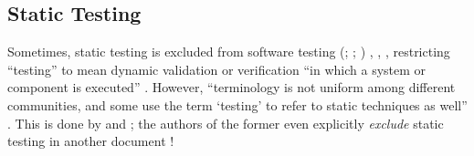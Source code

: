 \subsection{Static Testing}
\label{static-test}
Sometimes, static testing is excluded from software testing
\ifnotpaper
    (\citealp[p.~222]{AmmannAndOffutt2017}; \citealp[p.~13]{Firesmith2015};
    \citealp[p.~439]{PetersAndPedrycz2000})%
\else
    \cite[p.~439]{PetersAndPedrycz2000}, \cite[p.~13]{Firesmith2015},
    \cite[p.~222]{AmmannAndOffutt2017}%
\fi, restricting ``testing'' to mean dynamic validation \citep[p.~5\=/1]{SWEBOK2024}
or verification ``in which a system or component is
executed'' \citep[p.~427]{IEEE2017}. However, ``terminology is not uniform
among different communities, and some use the term `testing' to refer to
static techniques as well''
\citep[p.~5\=/2]{SWEBOK2024}. This is done by \citet[p.~17]{IEEE2022} and
\citet[pp.~8--9]{Gerrard2000a}; the \ifnotpaper \else authors of the \fi former
even explicitly \emph{exclude} static testing in another document
\citeyearpar[p.~440]{IEEE2017}!

\ifnotpaper



